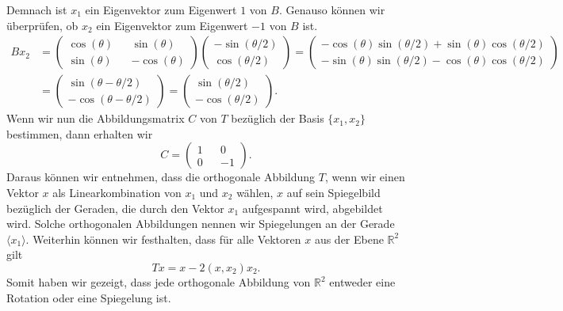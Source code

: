 Demnach ist $x_1$ ein Eigenvektor zum Eigenwert $1$ von $B$. Genauso können wir überprüfen, ob $x_2$ ein Eigenvektor zum Eigenwert $-1$ von $B$ ist.
\begin{align*}
	Bx_2 &= \begin{pmatrix}
		\cos(\theta) && \sin(\theta) \\
		\sin(\theta) && -\cos(\theta)
	\end{pmatrix} \begin{pmatrix}
		-\sin(\theta/2) \\
		\cos(\theta/2)
	\end{pmatrix} = \begin{pmatrix}
		-\cos(\theta)\sin(\theta/2)+\sin(\theta)\cos(\theta/2) \\
		-\sin(\theta)\sin(\theta/2)-\cos(\theta)\cos(\theta/2)
	\end{pmatrix} \\ &= \begin{pmatrix}
		\sin(\theta - \theta/2) \\
		-\cos(\theta - \theta/2)
	\end{pmatrix} = \begin{pmatrix}
		\sin(\theta/2) \\
		-\cos(\theta/2)
	\end{pmatrix}.
\end{align*}
Wenn wir nun die Abbildungsmatrix $C$ von $T$ bezüglich der Basis $\{x_1,x_2\}$ bestimmen, dann erhalten wir
$$C = \begin{pmatrix}
	1 && 0 \\
	0 && -1
\end{pmatrix}.$$
Daraus können wir entnehmen, dass die orthogonale Abbildung $T$, wenn wir einen Vektor $x$ als Linearkombination von $x_1$ und $x_2$ wählen, $x$ auf sein Spiegelbild bezüglich der Geraden, die durch den Vektor $x_1$ aufgespannt wird, abgebildet wird. Solche orthogonalen Abbildungen nennen wir Spiegelungen an der Gerade $\langle x_1 \rangle$. Weiterhin können wir festhalten, dass für alle Vektoren $x$ aus der Ebene $\mathbb{R}^2$ gilt
$$Tx = x - 2(x,x_2)x_2.$$
Somit haben wir gezeigt, dass jede orthogonale Abbildung von $\mathbb{R}^2$ entweder eine Rotation oder eine Spiegelung ist.

